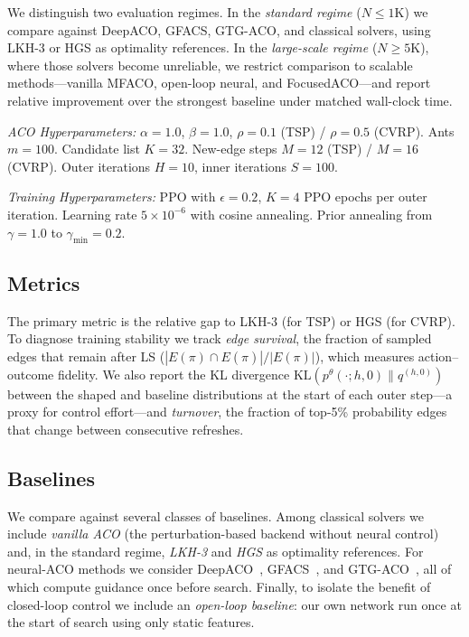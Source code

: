 \documentclass[sigconf,anonymous,review]{acmart}
\theoremstyle{definition}
\theoremstyle{plain}
\newcommand{\TSP}{\textsc{TSP}}
\newcommand{\CVRP}{\textsc{CVRP}}
\begin{document}
We distinguish two evaluation regimes.
In the \emph{standard regime} ($N \le 1$K) we compare against DeepACO, GFACS, GTG-ACO, and classical solvers, using LKH-3 or HGS as optimality references.
In the \emph{large-scale regime} ($N \ge 5$K), where those solvers become unreliable, we restrict comparison to scalable methods---vanilla MFACO, open-loop neural, and FocusedACO---and report relative improvement over the strongest baseline under matched wall-clock time.

\emph{ACO Hyperparameters:} $\alpha=1.0$, $\beta=1.0$, $\rho=0.1$ (\TSP{}) / $\rho=0.5$ (\CVRP{}).
Ants $m=100$. Candidate list $K=32$.
New-edge steps $M=12$ (\TSP{}) / $M=16$ (\CVRP{}).
Outer iterations $H=10$, inner iterations $S=100$.

\emph{Training Hyperparameters:} PPO with $\epsilon=0.2$, $K=4$ PPO epochs per outer iteration.
Learning rate $5 \times 10^{-6}$ with cosine annealing.
Prior annealing from $\gamma=1.0$ to $\gamma_{\min}=0.2$.

\subsection{Metrics}
The primary metric is the relative gap to LKH-3 (for TSP) or HGS (for CVRP).
To diagnose training stability we track \emph{edge survival}, the fraction of sampled edges that remain after LS ($|E(\pi)\cap E(\hat{\pi})|/|E(\pi)|$), which measures action--outcome fidelity.
We also report the KL divergence $\mathrm{KL}(p^\theta(\cdot; h, 0) \| q^{(h,0)})$ between the shaped and baseline distributions at the start of each outer step---a proxy for control effort---and \emph{turnover}, the fraction of top-5\% probability edges that change between consecutive refreshes.

\subsection{Baselines}
We compare against several classes of baselines.
Among classical solvers we include \emph{vanilla ACO} (the perturbation-based backend without neural control) and, in the standard regime, \emph{LKH-3} and \emph{HGS} as optimality references.
For neural-ACO methods we consider DeepACO~\cite{deepaco}, GFACS~\cite{gfacs}, and GTG-ACO~\cite{gtgaco}, all of which compute guidance once before search.
Finally, to isolate the benefit of closed-loop control we include an \emph{open-loop baseline}: our own network run once at the start of search using only static features.
\end{document}
